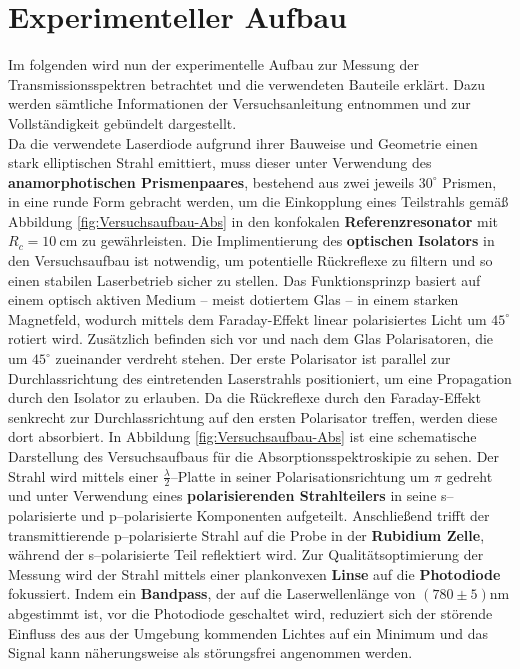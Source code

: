 \chapter{Experimenteller Aufbau}
\label{chap:experiment}

\noindent Im folgenden wird nun der experimentelle Aufbau zur Messung der Transmissionsspektren betrachtet und die verwendeten Bauteile erklärt. Dazu werden sämtliche Informationen der Versuchsanleitung \cite{H2} entnommen und zur Vollständigkeit gebündelt dargestellt.\\


\noindent Da die verwendete Laserdiode aufgrund ihrer Bauweise und Geometrie einen stark elliptischen Strahl emittiert, muss dieser unter Verwendung des \textbf{anamorphotischen Prismenpaares}, bestehend aus zwei jeweils $30^\circ$ Prismen, in eine runde Form gebracht werden, um die Einkopplung eines Teilstrahls gemäß Abbildung \ref{fig:Versuchsaufbau-Abs} in den konfokalen \textbf{Referenzresonator} mit $R_{c}=\SI{10}{\centi \meter}$ zu gewährleisten. Die Implimentierung des \textbf{optischen Isolators} in den Versuchsaufbau ist notwendig, um potentielle Rückreflexe zu filtern und so einen stabilen Laserbetrieb sicher zu stellen. Das Funktionsprinzp basiert auf einem optisch aktiven Medium -- meist dotiertem Glas -- in einem starken Magnetfeld, wodurch mittels dem Faraday-Effekt linear polarisiertes Licht um $45^\circ$ rotiert wird. Zusätzlich befinden sich vor und nach dem Glas Polarisatoren, die um $45^\circ$ zueinander verdreht stehen. Der erste Polarisator ist parallel zur Durchlassrichtung des eintretenden Laserstrahls positioniert, um eine Propagation durch den Isolator zu erlauben. Da die Rückreflexe durch den Faraday-Effekt senkrecht zur Durchlassrichtung auf den ersten Polarisator treffen, werden diese dort absorbiert. In Abbildung \ref{fig:Versuchsaufbau-Abs} ist eine schematische Darstellung des Versuchsaufbaus für die Absorptionsspektroskipie zu sehen. Der Strahl wird mittels einer \textbf{$\frac{\lambda}{2}$}--Platte in seiner Polarisationsrichtung um $\pi$ gedreht und unter Verwendung eines \textbf{polarisierenden Strahlteilers} in seine s--polarisierte und p--polarisierte Komponenten aufgeteilt. Anschließend trifft der transmittierende p--polarisierte Strahl auf die Probe in der \textbf{Rubidium Zelle}, während der s--polarisierte Teil reflektiert wird. Zur Qualitätsoptimierung der Messung wird der Strahl mittels einer plankonvexen \textbf{Linse} auf die \textbf{Photodiode} fokussiert. Indem ein \textbf{Bandpass}, der auf die Laserwellenlänge von $(780 \pm 5)$nm abgestimmt ist, vor die Photodiode geschaltet wird, reduziert sich der störende Einfluss des aus der Umgebung kommenden Lichtes auf ein Minimum und das Signal kann näherungsweise als störungsfrei angenommen werden.

